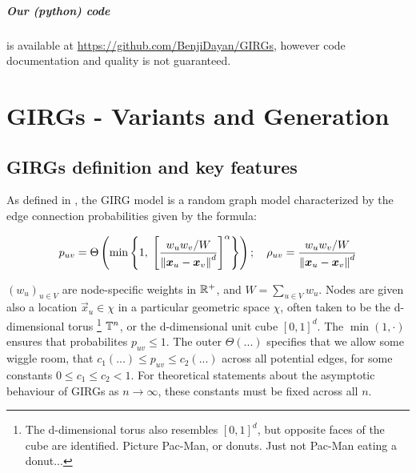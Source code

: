 \paragraph{Our (python) code} is available at \url{https://github.com/BenjiDayan/GIRGs}, however code documentation and quality is not guaranteed. 

\chapter{GIRGs - Variants and Generation}
\label{chap:GIRG_intro}
\minitoc
\section{GIRGs definition and key features}
\label{sec:GIRG_def}

As defined in \cite{bringmann2019geometric}, the GIRG model is a random graph model characterized by the edge connection probabilities given by the formula:


\begin{equation}
    p_{uv} = \Theta \left ( \min \left \{
        1,\;
        \left [
            \frac{w_u w_v / W}{\left\lVert \bm{x}_u - \bm{x}_v\right\rVert^d}
        \right ]^\alpha
    \right \}
    \right ) ; \quad \rho_{uv} = \frac{w_u w_v / W}{\left\lVert \bm{x}_u - \bm{x}_v\right\rVert^d}
    \label{eq:GIRG_puv_definition}
\end{equation}

$(w_u)_{u \in V}$ are node-specific weights in $\mathbb{R}^+$, and $W = \sum_{u \in V} w_u$. Nodes are given also a location $\vec{x}_u \in \chi$ in a particular geometric space $\chi$, often taken to be the d-dimensional torus
\footnote{The d-dimensional torus also resembles $[0, 1]^d$, but opposite faces of the cube are identified. Picture Pac-Man, or donuts. Just not Pac-Man eating a donut...}
$\mathbb{T}^n$, or the d-dimensional unit cube $[0, 1]^d$. The $\min(1, \cdot)$ ensures that probabilites $p_{uv} \leq 1$. The outer $\Theta(...)$ specifies that we allow some wiggle room, that $c_1 (...) \leq p_{uv} \leq c_2 (...)$ across all potential edges, for some constants $0 \leq c_1 \leq c_2 < 1$. For theoretical statements about the asymptotic behaviour of GIRGs as $n \to \infty$, these constants must be fixed across all $n$.

